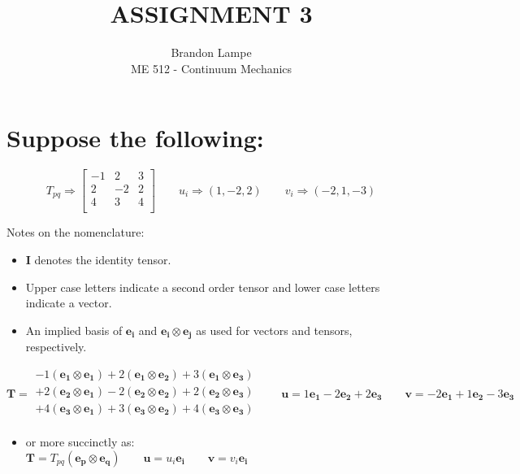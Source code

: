 \documentclass[10pt, letterpaper]{article}
\begin{document}
 
 
\title{ASSIGNMENT 3}%
\author{Brandon Lampe\\ %
ME 512 - Continuum Mechanics} %
 
\maketitle

\section{Suppose the following:}  
	\begin{equation*} 
		T_{pq}  \Rightarrow	\begin{bmatrix} -1 & 2 & 3 \\ 2 & -2 & 2 \\ 4 & 3 & 4\\
						 \end{bmatrix} \qquad		 
		u_i \Rightarrow (1, -2, 2) \qquad
		v_i \Rightarrow (-2, 1, -3)
	\end{equation*}
	
	Notes on the nomenclature:
	\begin{itemize}
		\item $\bm{I}$ denotes the identity tensor.
		\item Upper case letters indicate a second order tensor and lower case letters indicate a vector.
		\item An implied basis of $\bm{e_i}$ and $\bm{e_i} \otimes \bm{e_j}$ as used for vectors and 			tensors, respectively.
	\end{itemize}
	\begin{equation*} 
		\bm{T}  =	\begin{matrix*}
			 -1( \bm{e_1} \otimes \bm{e_1}) +  
			 2 (\bm{e_1} \otimes \bm{e_2})+  
			 3 (\bm{e_1} \otimes \bm{e_3}) \\
			 + 2 (\bm{e_2} \otimes \bm{e_1}) 
			 -2 (\bm{e_2} \otimes \bm{e_2})+ 
			 2 (\bm{e_2} \otimes \bm{e_3})  \\
			 +4 (\bm{e_3} \otimes \bm{e_1}) +
			 3 (\bm{e_3} \otimes \bm{e_2})+  
			 4 (\bm{e_3} \otimes \bm{e_3}) \\
		 \end{matrix*} \qquad		 
		\bm{u} = 1 \bm{e_1} -2 \bm{e_2} +2 \bm{e_3} \qquad
		\bm{v} = -2 \bm{e_1} + 1\bm{e_2} - 3\bm{e_3}
	\end{equation*}
	\begin{itemize}
		\item or more succinctly as:\\
	$\bm{T} = T_{pq} (\bm{e_p} \otimes \bm{e_q}) \qquad \bm{u} = u_i\bm{e_i} \qquad \bm{v} = v_i \bm{e_i}$
	\end{itemize}
\end{document}

